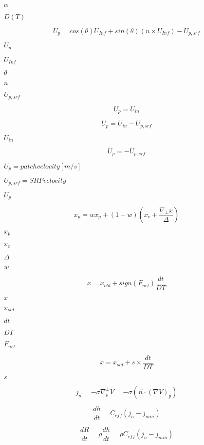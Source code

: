 \documentclass{article}
\begin{document}
$        \alpha  $
\pagebreak

$        D(T)    $
\pagebreak

\[
    U_p = cos(\theta) U_{Inf} + sin(\theta) (n \times U_{Inf}) - U_{p,srf}
\]
\pagebreak

$        U_p     $
\pagebreak

$        U_{Inf} $
\pagebreak

$        \theta  $
\pagebreak

$        n       $
\pagebreak

$        U_{p,srf} $
\pagebreak

\[
        U_p = U_{in}
    \]
\pagebreak

\[
        U_p = U_{in} - U_{p,srf}
    \]
\pagebreak

$        U_{in}  $
\pagebreak

\[
        U_p = - U_{p,srf}
    \]
\pagebreak

$        U_p     = patch velocity [m/s]$
\pagebreak

$        U_{p,srf} = SRF velocity$
\pagebreak

$ U_p $
\pagebreak

\[
        x_p = w x_p + (1-w) \left(x_c + \frac{\nabla_\perp x}{\Delta}\right)
    \]
\pagebreak

$        x_p   $
\pagebreak

$        x_c   $
\pagebreak

$        \Delta$
\pagebreak

$        w     $
\pagebreak

\[
        x = x_{old} + sign(F_{net})\frac{dt}{DT}
    \]
\pagebreak

$        x       $
\pagebreak

$        x_{old} $
\pagebreak

$        dt      $
\pagebreak

$        DT      $
\pagebreak

$        F_{net} $
\pagebreak

\[
        x = x_{old} + s \times \frac{dt}{DT}
    \]
\pagebreak

$        s       $
\pagebreak

\[
    j_n = - \sigma \nabla^\perp_p V = - \sigma (\vec{n}\cdot(\nabla V)_p)
\]
\pagebreak

\[
    \frac{dh}{dt} = C_{eff} (j_n - j_{min})
\]
\pagebreak

\[
    \frac{dR}{dt} = \rho \frac{dh}{dt} = \rho C_{eff} (j_n - j_{min})
\]
\pagebreak
\end{document}
